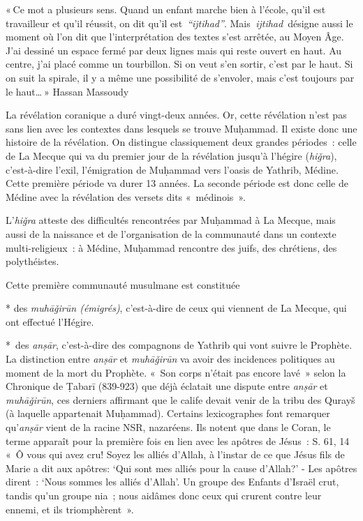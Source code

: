 \begin{cite}
« Ce mot a plusieurs sens. Quand un enfant marche bien à l'école, qu'il
est travailleur et qu'il réussit, on dit qu'il est~\emph{``ijtihad''}.
Mais  \emph{ijtihad}~désigne aussi le moment où l'on dit que
l'interprétation des textes s'est arrêtée, au Moyen Âge. J'ai dessiné un
espace fermé par deux lignes mais qui reste ouvert en haut. Au centre,
j'ai placé comme un tourbillon. Si on veut s'en sortir, c'est par le
haut. Si on suit la spirale, il y a même une possibilité de s'envoler,
mais c'est toujours par le haut\ldots{} » Hassan Massoudy
\end{cite}




La révélation coranique a duré vingt-deux années. Or, cette révélation
n'est pas sans lien avec les contextes dans lesquels se trouve Muḥammad.
Il existe donc une histoire de la révélation. On distingue classiquement
deux grandes périodes~: celle de La Mecque qui va du premier jour de la
révélation jusqu'à l'hégire (\emph{hiǧra}), c'est-à-dire l'exil,
l'émigration de Muḥammad vers l'oasis de Yathrib, Médine. Cette première
période va durer 13 années. La seconde période est donc celle de Médine
avec la révélation des versets dits «~médinois~».

L'\emph{hiǧra}   atteste des difficultés rencontrées par Muḥammad à
La Mecque, mais aussi de la naissance et de l'organisation de la
communauté dans un contexte multi-religieux~: à Médine, Muḥammad
rencontre des juifs, des chrétiens, des polythéistes.

Cette première communauté musulmane est constituée

* des \emph{muhāǧirūn (émigrés)}, c'est-à-dire de ceux qui viennent de
La Mecque, qui ont effectué l'Hégire.

*~des \emph{anṣār}, c'est-à-dire des compagnons de Yathrib qui vont
suivre le Prophète. La distinction entre \emph{anṣār} et
\emph{muhāǧirūn} va avoir des incidences politiques au moment de la mort
du Prophète. «~Son corps n'était pas encore lavé~» selon la Chronique de
Ṭabarī (839-923) que déjà
éclatait une dispute entre \emph{anṣār} et \emph{muhāǧirūn}, ces
derniers affirmant que le calife devait venir de la tribu des Qurayš (à
laquelle appartenait Muḥammad). Certains lexicographes font remarquer
qu'\emph{anṣār} vient de la racine NSR, nazaréens. Ils notent que dans
le Coran, le terme apparaît pour la première fois en lien avec les
apôtres de Jésus~: S. 61, 14 «~Ô vous qui avez cru! Soyez les alliés
d'Allah, à l'instar de ce que Jésus fils de Marie a dit aux apôtres:
`Qui sont mes alliés pour la cause d'Allah?' - Les apôtres dirent~:
`Nous sommes les alliés d'Allah'. Un groupe des Enfants d'Israël crut,
tandis qu'un groupe nia~; nous aidâmes donc ceux qui crurent contre leur
ennemi, et ils triomphèrent~».

